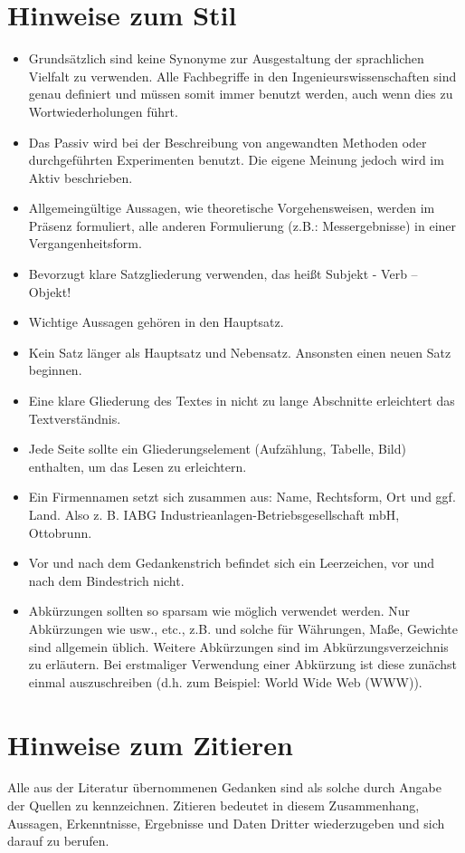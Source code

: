 \documentclass[utf8, a4paper, 11pt, parskip, pointlessnumbers]{scrreprt}
\begin{document}
\section{Hinweise zum Stil}
\begin{itemize}
\item	Grundsätzlich sind keine Synonyme zur Ausgestaltung der sprachlichen Vielfalt zu verwenden. Alle Fachbegriffe in den Ingenieurswissenschaften sind genau definiert und müssen somit immer benutzt werden, auch wenn dies zu Wortwiederholungen führt.
\item	Das Passiv wird bei der Beschreibung von angewandten Methoden oder durchgeführten Experimenten benutzt. Die eigene Meinung jedoch wird im Aktiv beschrieben.
\item	Allgemeingültige Aussagen, wie theoretische Vorgehensweisen, werden im Präsenz formuliert, alle anderen Formulierung (z.B.: Messergebnisse) in einer Vergangenheitsform.
\item Bevorzugt klare Satzgliederung verwenden, das heißt Subjekt - Verb – Objekt!
\item	Wichtige Aussagen gehören in den Hauptsatz.
\item	Kein Satz länger als Hauptsatz und Nebensatz. Ansonsten einen neuen Satz beginnen.
\item	Eine klare Gliederung des Textes in nicht zu lange Abschnitte erleichtert das Textverständnis.
\item Jede Seite sollte ein Gliederungselement (Aufzählung, Tabelle, Bild) enthalten, um das Lesen zu erleichtern.
\item Ein Firmennamen setzt sich zusammen aus: Name, Rechtsform, Ort und ggf. Land. Also z. B. IABG Industrieanlagen-Betriebsgesellschaft mbH, Ottobrunn.
\item Vor und nach dem Gedankenstrich befindet sich ein Leerzeichen, vor und nach dem Bindestrich nicht.
\item Abkürzungen sollten so sparsam wie möglich verwendet werden. Nur Abkürzungen wie usw., etc., z.B. und solche für Währungen, Maße, Gewichte sind allgemein üblich. Weitere Abkürzungen sind im Abkürzungsverzeichnis zu erläutern. Bei erstmaliger Verwendung einer Abkürzung ist diese zunächst einmal auszuschreiben (d.h. zum Beispiel: World Wide Web (WWW)). 
\end{itemize}

\section{Hinweise zum Zitieren}
Alle aus der Literatur übernommenen Gedanken sind als solche durch Angabe der Quellen zu kennzeichnen. Zitieren bedeutet in diesem Zusammenhang, Aussagen, Erkenntnisse, Ergebnisse und Daten Dritter wiederzugeben und sich darauf zu berufen. 
\end{document}
